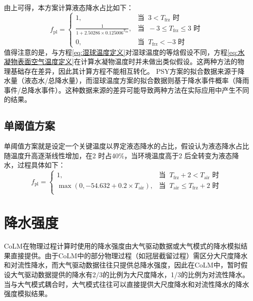 由上可得，本方案计算液态降水占比如下：
\begin{equation}
  f_{\mathrm{pl}}= \begin{cases}
    1, & \text{当 }\ 3 < T_{\mathrm {frz}} \text{ 时}\\
    \frac{1}{1 + 2.50286\times 0.125006^{T_{\mathrm{frz}}}}, & \text{当 }\ -3\leqslant T_{\mathrm {frz}} \leqslant  3 \text{ 时} \\
    0, & \text{当 }\ T_{\mathrm {frz}} < -3 \text{ 时}
  \end{cases}
\end{equation}
值得注意的是，与方程\eqref{eq:湿球温度定义}对湿球温度的等焓假设不同，方程\eqref{eq:水凝物表面空气温度定义}在计算水凝物温度时并未做出类似假设。这两种方法的物理基础存在差异，因此其计算方程不能相互转化。
PSY方案的拟合数据来源于降水量（液态水/总降水量），而湿球温度方案的拟合数据则基于降水事件概率（降雨事件/总降水事件）。这种数据来源的差异可能导致两种方法在实际应用中产生不同的结果。






\subsection{单阈值方案}
单阈值方案就是设定一个关键温度以界定液态降水的占比，假设认为液态降水占比随温度升高逐渐线性增加，在2 \textcelsius 时占40\%，当环境温度高于2 \textcelsius 后全转变为液态降水，过程具体如下：
\begin{equation}
  f_{\mathrm{pl}}= \begin{cases}
    1, & \text{当 }\ T_{\mathrm{frz}}+2 < T_{\mathrm {air}} \text{ 时}\\
    \max(0,-54.632 + 0.2\times T_{\mathrm {air}}), & \text{当 }\ T_{\mathrm {air}} \leqslant T_{\mathrm{frz}} + 2 \text{ 时} \\
  \end{cases}
\end{equation}


\section{降水强度}
CoLM在物理过程计算时使用的降水强度由大气驱动数据或大气模式的降水模拟结果直接提供。由于CoLM中的部分物理过程（如冠层截留过程）需区分大尺度降水和对流性降水，而大气驱动数据往往只提供总降水强度，因此在CoLM中，暂时假设大气驱动数据提供的降水有2/3的比例为大尺度降水，1/3的比例为对流性降水。当与大气模式耦合时，大气模式往往可以直接提供大尺度降水和对流性降水的降水强度模拟结果。


